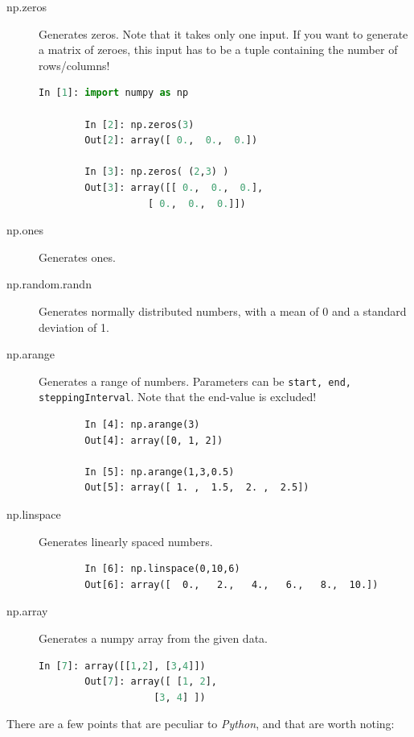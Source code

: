 \begin{description}
  \item[np.zeros] Generates zeros. Note that it takes only one input. If you want to generate a matrix of zeroes, this input has to be a tuple containing the number of rows/columns!

    \begin{lstlisting}[language=python]
        In [1]: import numpy as np

        In [2]: np.zeros(3)
        Out[2]: array([ 0.,  0.,  0.])

        In [3]: np.zeros( (2,3) )
        Out[3]: array([[ 0.,  0.,  0.],
                   [ 0.,  0.,  0.]])
    \end{lstlisting}

  \item[np.ones] Generates ones.

  \item[np.random.randn] Generates normally distributed numbers, with a mean of 0 and a standard deviation of 1.

  \item[np.arange] Generates a range of numbers. Parameters can be \lstinline{start, end, steppingInterval}. Note that the end-value is excluded!
    \begin{lstlisting}
        In [4]: np.arange(3)
        Out[4]: array([0, 1, 2])

        In [5]: np.arange(1,3,0.5)
        Out[5]: array([ 1. ,  1.5,  2. ,  2.5])
    \end{lstlisting}

  \item[np.linspace] Generates linearly spaced numbers.
    \begin{lstlisting}
        In [6]: np.linspace(0,10,6)
        Out[6]: array([  0.,   2.,   4.,   6.,   8.,  10.])
    \end{lstlisting}

  \item[np.array] Generates a numpy array from the given data.
    \begin{lstlisting}[language=Python]
        In [7]: array([[1,2], [3,4]])
        Out[7]: array([ [1, 2],
                    [3, 4] ])
    \end{lstlisting}

\end{description}

There are a few points that are peculiar to \emph{Python}, and that are worth noting:

